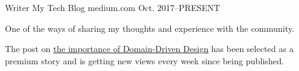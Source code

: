 

\begin{cventries}

  \cventry
    {Writer} %
    {My Tech Blog} %
    {medium.com} %
    {Oct. 2017–PRESENT} %
    {
      \begin{cvitems} %
        \item {One of the ways of sharing my thoughts and experience with the community.}
        \item {The post on \href{https://medium.com/swinginc/save-time-by-doing-time-the-right-way-with-domain-driven-apis-72321fe09a90}{\underline{the importance of Domain-Driven Design}} has been selected as a premium story and is getting new views every week since being published.}
      \end{cvitems}
    }

\end{cventries}
